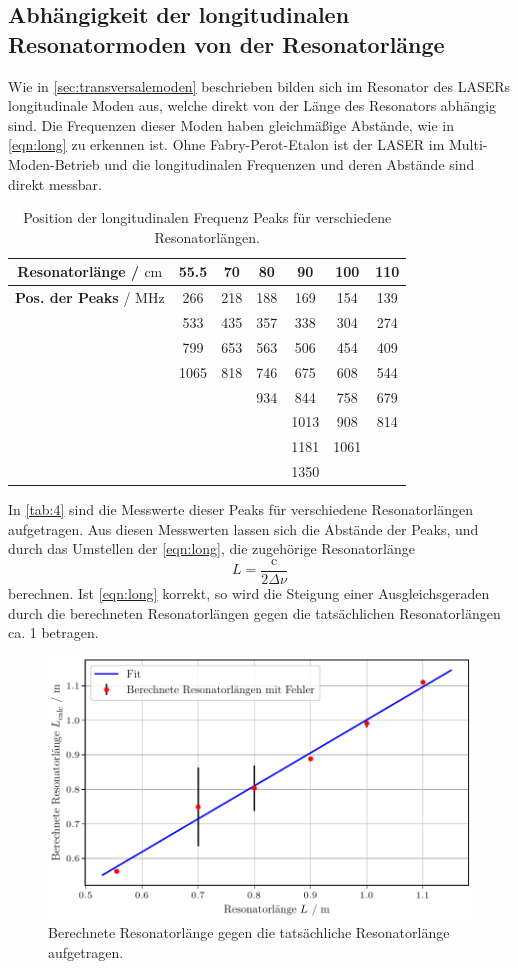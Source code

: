 \subsection{Abhängigkeit der longitudinalen Resonatormoden von der Resonatorlänge}
Wie in \autoref{sec:transversalemoden} beschrieben bilden sich im Resonator des LASERs longitudinale Moden aus, welche direkt von der Länge des Resonators abhängig sind. Die Frequenzen dieser Moden haben gleichmäßige Abstände, wie in \autoref{eqn:long} zu erkennen ist.
Ohne Fabry-Perot-Etalon ist der LASER im Multi-Moden-Betrieb und die longitudinalen Frequenzen und deren Abstände sind direkt messbar.
\begin{table}[H]
  \centering
  \caption{Position der longitudinalen Frequenz Peaks für verschiedene Resonatorlängen.}
  \begin{tabular}{S ||S| S| S| S| S| S}
      \toprule
      {\textbf{Resonatorlänge} / $\mathrm{cm}$} & {55.5} & {70}  & {80} & {90} & {100}  & {110}\\
      \midrule
      {\textbf{Pos. der Peaks} / $\mathrm{MHz}$} & 266 & 218& 188& 169& 154& 139\\
       &533 & 435 & 357 & 338 & 304 & 274 \\
       &799 & 653 & 563 & 506 & 454 & 409 \\
       &1065 & 818 & 746 & 675 & 608 & 544 \\
       & & &934 & 844 & 758 & 679 \\
       & & & &1013 & 908 & 814 \\
       & & & & 1181 & 1061 & \\
       & & & & 1350 & & \\
      \bottomrule
  \end{tabular}
  \label{tab:4}
\end{table}
\noindent
In \autoref{tab:4} sind die Messwerte dieser Peaks für verschiedene Resonatorlängen aufgetragen. Aus diesen Messwerten lassen sich die Abstände der Peaks, und durch das Umstellen der \autoref{eqn:long}, die zugehörige Resonatorlänge
\begin{equation}
  L = \frac{\text{c}}{2 \Delta \nu}
\end{equation}
berechnen. Ist \autoref{eqn:long} korrekt, so wird die Steigung einer Ausgleichsgeraden durch die berechneten Resonatorlängen gegen die tatsächlichen Resonatorlängen ca. 1 betragen.
\begin{figure}[H]
  \centering
  \includegraphics[width=0.7\linewidth]{plots/long_mode.pdf}
  \caption{Berechnete Resonatorlänge gegen die tatsächliche Resonatorlänge aufgetragen.}
  \label{fig:3}
\end{figure}
